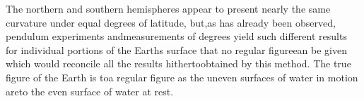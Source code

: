 The northern and southern hemispheres appear to present nearly the same curvature under equal degrees of latitude, but,as has already been observed, pendulum experiments andmeasurements of degrees yield such different results for individual portions of the Earths surface that no regular figureean be given which would reconcile all the results hithertoobtained by this method. The true figure of the Earth is toa regular figure as the uneven surfaces of water in motion areto the even surface of water at rest.